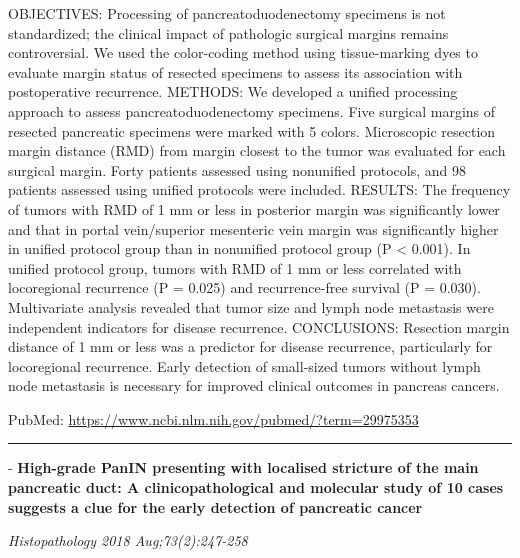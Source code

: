 \documentclass[]{article}
\begin{document}
OBJECTIVES: Processing of pancreatoduodenectomy specimens is not
standardized; the clinical impact of pathologic surgical margins remains
controversial. We used the color-coding method using tissue-marking dyes
to evaluate margin status of resected specimens to assess its
association with postoperative recurrence. METHODS: We developed a
unified processing approach to assess pancreatoduodenectomy specimens.
Five surgical margins of resected pancreatic specimens were marked with
5 colors. Microscopic resection margin distance (RMD) from margin
closest to the tumor was evaluated for each surgical margin. Forty
patients assessed using nonunified protocols, and 98 patients assessed
using unified protocols were included. RESULTS: The frequency of tumors
with RMD of 1 mm or less in posterior margin was significantly lower and
that in portal vein/superior mesenteric vein margin was significantly
higher in unified protocol group than in nonunified protocol group (P
\textless{} 0.001). In unified protocol group, tumors with RMD of 1 mm
or less correlated with locoregional recurrence (P = 0.025) and
recurrence-free survival (P = 0.030). Multivariate analysis revealed
that tumor size and lymph node metastasis were independent indicators
for disease recurrence. CONCLUSIONS: Resection margin distance of 1 mm
or less was a predictor for disease recurrence, particularly for
locoregional recurrence. Early detection of small-sized tumors without
lymph node metastasis is necessary for improved clinical outcomes in
pancreas cancers.

PubMed: \url{https://www.ncbi.nlm.nih.gov/pubmed/?term=29975353}

{}

{}

\begin{center}\rule{0.5\linewidth}{\linethickness}\end{center}

 - \textbf{High-grade PanIN presenting with localised stricture of the
main pancreatic duct: A clinicopathological and molecular study of 10
cases suggests a clue for the early detection of pancreatic cancer}

\emph{Histopathology 2018 Aug;73(2):247-258}
\end{document}
